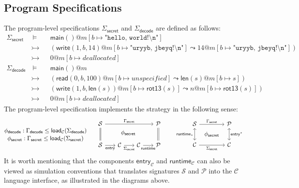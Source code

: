 \documentclass[acmsmall,screen,review,nonacm]{acmart}
\newcommand{\kw}[1]{\ensuremath{ \mathsf{#1} }}
\begin{document}
\subsection{Program Specifications}

The
program-level specifications
$\Sigma_\kw{secret}$ and $\Sigma_\kw{decode}$
are defined as follows:
{\small
\begin{align*}
  \Sigma_\kw{secret} & \:\vDash\: &&
  \kw{main()}@m[b \mapsto \texttt{"hello, world!\textbackslash{}n"}] \\
  & \rightarrowtail &&
    (\kw{write}(1, b, 14)@m [b \mapsto \texttt{"uryyb, jbeyq!\textbackslash{}n"}]
   \leadsto 14@m[b \mapsto \texttt{"uryyb, jbeyq!\textbackslash{}n"}]) \\
  & \rightarrowtail && 0@m[b \mapsto deallocated] \\
  \Sigma_\kw{decode} & \:\vDash\ &&
  \kw{main()}@m \\
  & \rightarrowtail && ( \kw{read}(0, b, 100)@m[b \mapsto unspecified]
   \leadsto \kw{len}(s)@m[b \mapsto s]) \\
  & \rightarrowtail && (\kw{write}(1, b, \kw{len}(s))@m[b\mapsto \kw{rot13}(s)]
   \leadsto n@m[b\mapsto \kw{rot13}(s)]) \\
  & \rightarrowtail && 0@m[b \mapsto deallocated]
\end{align*}}
The program-level specification
implements the strategy
in the following sense:
{\small
\[
  \begin{prooftree}
    \hypo{\phi_\kw{decode}: \Gamma_\kw{decode} \le \kw{load}_\mathcal{C}(\Sigma_\kw{decode})}
    \infer[no rule]1
    {\phi_\kw{secret}: \Gamma_\kw{secret} \le \kw{load}_\mathcal{C}(\Sigma_\kw{secret})}
  \end{prooftree}
  \quad
  \begin{array}{c}
    \begin{tikzcd}[row sep=2.5ex, column sep=4ex]
      \mathcal{S} \ar[dd, equal]
      \ar[rrr, "\Gamma_\kw{secret}"]
       &&&
      \mathcal{P} \ar[dd, equal] \\
      & &|[xshift=-4ex, overlay]| \phi_\kw{secret} & \\
      \mathcal{S} \ar[r, "\kw{entry}"'] & \mathcal{C} \ar[r, "\Sigma_\kw{secret}"'] & \mathcal{C}\ar[r, "\kw{runtime}"']  & \mathcal{P}
    \end{tikzcd}
  \end{array}
  \quad
  \begin{array}{c}
    \begin{tikzcd}[row sep=0.5ex, column sep=1ex]
      \mathcal{S} \ar[dd, leftrightarrow, "\kw{runtime}_*"']
	  \ar[rr, "\Gamma_\kw{secret}"] &&
      \mathcal{P} \ar[dd, leftrightarrow, "\kw{entry}^*"] \\
      & \phi_\kw{secret} & \\
      \mathcal{C} \ar[rr, "\Sigma_\kw{secret}"'] &&
      \mathcal{C}
    \end{tikzcd}
  \end{array}
\]}%
It is worth mentioning that
the components $\kw{entry}_\mathcal{C}$ and $\kw{runtime}_\mathcal{C}$
can also be viewed as simulation conventions
that translates signatures $\mathcal{S}$ and $\mathcal{P}$
into the $\mathcal{C}$ language interface,
as illustrated in the diagrams above.
\end{document}
